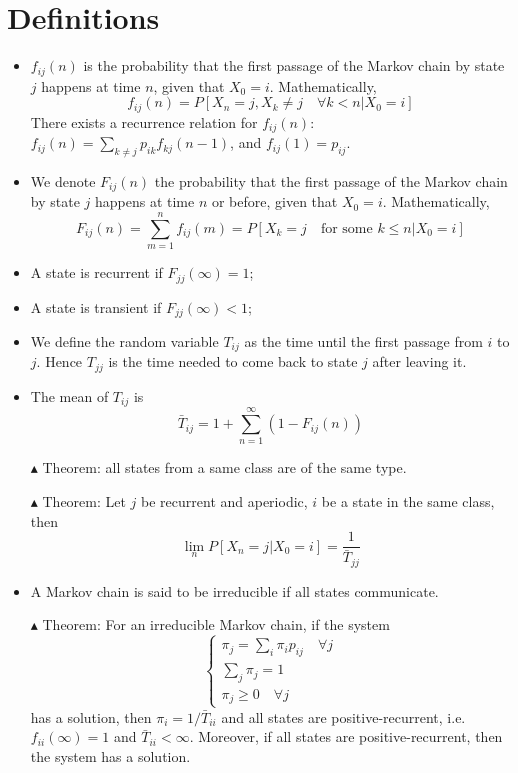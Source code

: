 \documentclass[12pt, openany]{report}
\theoremstyle{definition}
\begin{document}
\section{Definitions}
\begin{itemize}
	\item $f_{ij}(n)$ is the probability that the first passage of the Markov chain by state $j$ happens at time $n$, given that $X_0=i$. Mathematically,
	\begin{equation}
		f_{ij}(n) = P[X_n=j, X_k\neq j \quad \forall k<n|X_0=i]
	\end{equation}
	There exists a recurrence relation for $f_{ij}(n)$: $f_{ij}(n) = \sum_{k\neq j}p_{ik}f_{kj}(n-1)$, and $f_{ij}(1)=p_{ij}$.
	\item We denote $F_{ij}(n)$ the probability that the first passage of the Markov chain by state $j$ happens at time $n$ or before, given that $X_0=i$. Mathematically,
	\begin{equation}
		F_{ij}(n) = \sum_{m=1}^n f_{ij}(m) = P[X_k=j \quad \text{for some } k\le n|X_0=i]
	\end{equation}
	\item A state is recurrent if $F_{jj}(\infty)=1$;
	\item A state is transient if $F_{jj}(\infty)<1$;
	\item We define the random variable $T_{ij}$ as the time until the first passage from $i$ to $j$. Hence $T_{jj}$ is the time needed to come back to state $j$ after leaving it. 
	\item The mean of $T_{ij}$ is 
	\begin{equation}
		\bar T_{ij} = 1 + \sum_{n=1}^\infty (1-F_{ij}(n))
	\end{equation}
	\item [$\blacktriangle$] Theorem: all states from a same class are of the same type.
	\item [$\blacktriangle$] Theorem: Let $j$ be recurrent and aperiodic, $i$ be a state in the same class, then 
	\begin{equation}
		\lim_n P[X_n=j|X_0=i] = \frac{1}{\bar T_{jj}}
	\end{equation}
	\item A Markov chain is said to be irreducible if all states communicate. 
	\item [$\blacktriangle$] Theorem: For an irreducible Markov chain, if the system 
	\begin{equation}
		\begin{cases}
			\pi_j = \sum_i \pi_i p_{ij} \quad \forall j \\
			\sum_j \pi_j = 1\\
			\pi_j \ge 0 \quad \forall j
		\end{cases}
	\end{equation}
	has a solution, then $\pi_i = 1/\bar T_{ii}$ and all states are positive-recurrent, i.e. $f_{ii}(\infty) = 1$ and $\bar T_{ii}<\infty$.
	Moreover, if all states are positive-recurrent, then the system has a solution.
\end{itemize}
\end{document}
